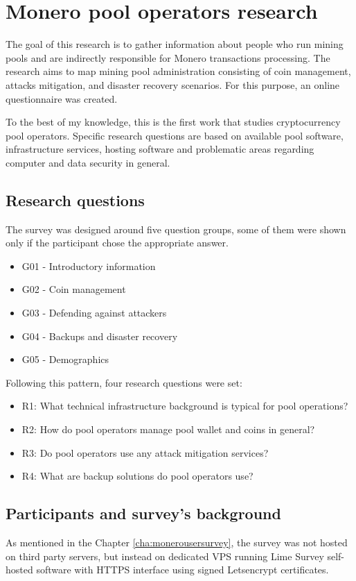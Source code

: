 \documentclass[
  printed, %
  table,   %
  nolof,     %
  nolot,     %
           oneside, color
]{fithesis3}
\begin{document}
\iffalse
\chapter{Monero pool operators research}
The goal of this research is to gather information about people who run mining pools and are indirectly responsible for Monero transactions processing. The research aims to map mining pool administration consisting of coin management, attacks mitigation, and disaster recovery scenarios. For this purpose, an online questionnaire was created. 

To the best of my knowledge, this is the first work that studies cryptocurrency pool operators. Specific research questions are based on available pool software, infrastructure services, hosting software and problematic areas regarding computer and data security in general.

\section{Research questions}

The survey was designed around five question groups, some of them were shown only if the participant chose the appropriate answer.
\begin{itemize}\itemsep0em
\item G01 - Introductory information
\item G02 - Coin management
\item G03 - Defending against attackers
\item G04 - Backups and disaster recovery
\item G05 - Demographics
\end{itemize}
Following this pattern, four research questions were set:
\begin{itemize}\itemsep0em
\item R1: What technical infrastructure background is typical for pool operations?
\item R2: How do pool operators manage pool wallet and coins in general?
\item R3: Do pool operators use any attack mitigation services?
\item R4: What are backup solutions do pool operators use?
\end{itemize}
\section{Participants and survey's background}
As mentioned in the Chapter \ref{cha:monerousersurvey}, the survey was not hosted on third party servers, but instead on dedicated VPS running Lime Survey self-hosted software with HTTPS interface using signed Letsencrypt certificates.
\end{document}
